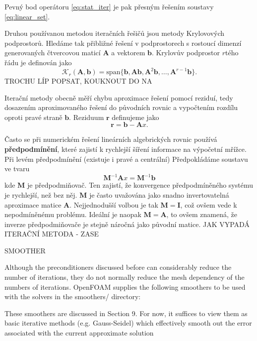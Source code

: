\documentclass[a4paper,12pt]{report}
\theoremstyle{remark}
\begin{document}
	Pevný bod operátoru \eqref{eq:stat_iter} je pak přesným řešením soustavy \eqref{eq:linear_set}.  
	
	Druhou používanou metodou iteračních řešičů jsou metody Krylovových podprostorů. Hledáme tak přibližné řešení v podprostorech s rostoucí dimenzí generovaných čtvercovou maticí $\boldsymbol{A}$ a vektorem $\boldsymbol{b}$. Krylovův podprostor $r$tého řádu je definován jako 
	$$\mathcal{K}_r(\boldsymbol{A},\boldsymbol{b}) = \textrm{span}\{\boldsymbol{b}, \boldsymbol{Ab}, \boldsymbol{A}^2\boldsymbol{b}, \dots, \boldsymbol{A}^{r-1}\boldsymbol{b}\}.$$
	TROCHU LÍP POPSAT, KOUKNOUT DO NA
	
	Iterační metody obecně měří chybu aproximace řešení pomocí reziduí, tedy dosazením aproximovaného řešení do původních rovnic a vypočtením rozdílu oproti pravé straně $\boldsymbol{b}$. Reziduum $\boldsymbol{r}$ definujeme jako 
	\begin{equation}
		\boldsymbol{r} = \boldsymbol{b}-\boldsymbol{A}x.
		\label{eq:residuum}
	\end{equation} 
	
	
	Často se při numerickém řešení lineárních algebrických rovnic používá \textbf{předpodmínění}, které zajistí k rychlejší šíření informace na výpočetní mřížce. Při levém předpodmínění (existuje i pravé a centrální) Předpokládáme soustavu ve tvaru
	$$\boldsymbol{M}^{-1}\boldsymbol{A}x =\boldsymbol{M}^{-1}\boldsymbol{b}$$
	kde $\boldsymbol{M}$ je předpodmiňovač. Ten zajistí, že konvergence předpodmíněného systému je rychlejší, než bez něj. $\boldsymbol{M}$ je často uvažována jako snadno invertovatelná aproximace matice $\boldsymbol{A}$. Nejjednodušší volbou je tak $\boldsymbol{M} = \boldsymbol{I}$, což ovšem vede k nepodmíněnému problému. Ideální je naopak $\boldsymbol{M} = \boldsymbol{A}$, to ovšem znamená, že inverze předpodmiňovače je stejně náročná jako původní matice. JAK VYPADÁ ITERAČNÍ METODA - ZASE 
	

	
	SMOOTHER
	
	Although the preconditioners discussed before can considerably reduce the number of iterations, they do not normally reduce the mesh dependency of the numbers of iterations. OpenFOAM supplies the following smoothers to be used with the solvers in the smoothers/ directory:
	
	These smoothers are discussed in Section 9. For now, it suffices to view them as basic iterative methods (e.g. Gauss-Seidel) which effectively smooth out the error associated with
	the current approximate solution
	
\end{document}
